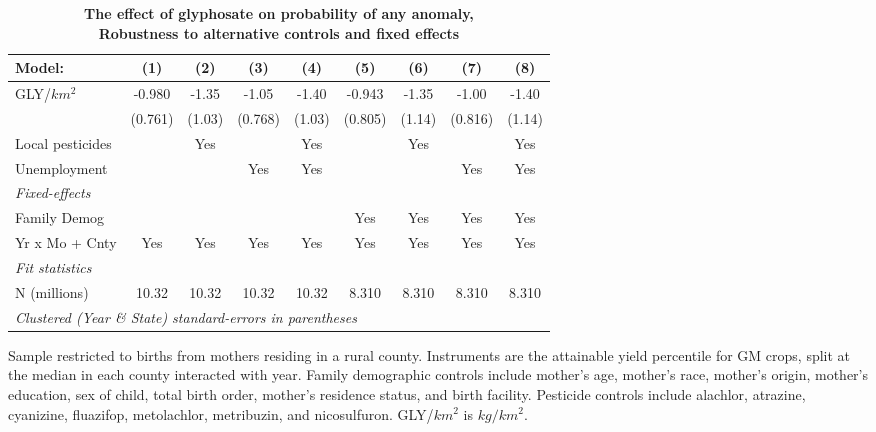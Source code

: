 \begin{table}[htbp]
   \centering
   \small
   \begin{threeparttable}[b]
      \caption{\label{tab:robust-cntrl-any_anomaly-allyielddiffgmo500} \textbf{The effect of glyphosate on probability of any anomaly, \\ Robustness to alternative controls and fixed effects}}
      \begin{tabular}{lcccccccc}
         \toprule
         Model:           & (1)     & (2)    & (3)     & (4)    & (5)     & (6)    & (7)     & (8)\\  
         \midrule 
         GLY/$km^2$       & -0.980  & -1.35  & -1.05   & -1.40  & -0.943  & -1.35  & -1.00   & -1.40\\   
                          & (0.761) & (1.03) & (0.768) & (1.03) & (0.805) & (1.14) & (0.816) & (1.14)\\   
         Local pesticides &         & Yes    &         & Yes    &         & Yes    &         & Yes\\  
         Unemployment     &         &        & Yes     & Yes    &         &        & Yes     & Yes\\  
         \midrule
         \emph{Fixed-effects}\\
         Family Demog     &         &        &         &        & Yes     & Yes    & Yes     & Yes\\  
         Yr x Mo + Cnty   & Yes     & Yes    & Yes     & Yes    & Yes     & Yes    & Yes     & Yes\\  
         \midrule
         \emph{Fit statistics}\\
         N (millions)     & 10.32   & 10.32  & 10.32   & 10.32  & 8.310   & 8.310  & 8.310   & 8.310\\  
         \midrule
         \multicolumn{9}{l}{\emph{Clustered (Year \& State) standard-errors in parentheses}}\\
      \end{tabular}
      
      \begin{tablenotes}\item Sample restricted to births from mothers residing in a rural county. Instruments are the attainable yield percentile for GM crops, split at the median in each county interacted with year. Family demographic controls include mother's age, mother's race, mother's origin, mother's education, sex of child, total birth order, mother's residence status, and birth facility. Pesticide controls include alachlor, atrazine, cyanizine, fluazifop, metolachlor, metribuzin, and nicosulfuron. GLY/$km^2$ is $kg/km^2$.
      \end{tablenotes}
   \end{threeparttable}
\end{table}
